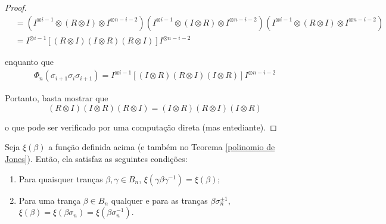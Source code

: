 \begin{proof}
\begin{align*}
		&= (I^{\otimes i-1} \otimes (R\otimes I) \otimes I^{\otimes n-i-2}) (I^{\otimes i-1} \otimes (I\otimes R) \otimes I^{\otimes n-i-2}) (I^{\otimes i-1} \otimes (R \otimes I) \otimes I^{\otimes n-i-2}) \\
		&= I^{\otimes i-1}[(R \otimes I)(I \otimes R)(R \otimes I)]I^{\otimes n-i-2}
		\end{align*}
		\par\vspace{0.3cm} enquanto que
		\begin{align*}
		\Phi_n(\sigma_{i+1}\sigma_i\sigma_{i+1}) = I^{\otimes i-1}[(I \otimes R)(R \otimes I)(I \otimes R)]I^{\otimes n-i-2}
		\end{align*}
		\par\vspace{0.3cm} Portanto, basta mostrar que
		\begin{equation*}
		(R \otimes I)(I \otimes R)(R \otimes I) = (I \otimes R)(R \otimes I)(I \otimes R)
		\end{equation*}
		\par\vspace{0.3cm} o que pode ser verificado por uma computação direta (mas entediante).
	\end{proof}
	\begin{lemma}
		\label{lema 2 Jones}
		Seja $\xi(\beta)$ a função definida acima (e também no Teorema \eqref{polinomio de Jones}). Então, ela satisfaz as seguintes condições:
		\begin{enumerate}
			\item Para quaisquer tranças $\beta, \gamma\in B_n$, $\xi(\gamma\beta\gamma^{-1})=\xi(\beta)$;
			\item Para uma trança $\beta\in B_n$ qualquer e para as tranças $\beta\sigma_n^{\pm1}$, $\xi(\beta) = \xi(\beta\sigma_n) = \xi(\beta\sigma_n^{-1})$.
		\end{enumerate}
	\end{lemma}
